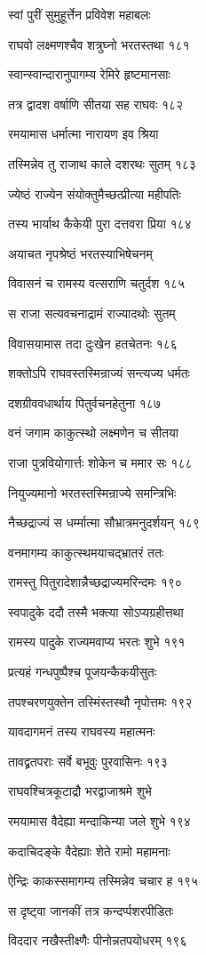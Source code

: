 स्वां पुरीं सुमुहूर्त्तेन प्रविवेश महाबलः

राघवो लक्ष्मणश्चैव शत्रुघ्नो भरतस्तथा १८१

स्वान्स्वान्दारानुपागम्य रेमिरे हृष्टमानसाः

तत्र द्वादश वर्षाणि सीतया सह राघवः १८२

रमयामास धर्मात्मा नारायण इव श्रिया

तस्मिन्नेव तु राजाथ काले दशरथः सुतम् १८३

ज्येष्ठं राज्येन संयोक्तुमैच्छत्प्रीत्या महीपतिः

तस्य भार्याथ कैकेयी पुरा दत्तवरा प्रिया १८४

अयाचत नृपश्रेष्ठं भरतस्याभिषेचनम्

विवासनं च रामस्य वत्सराणि चतुर्दश १८५

स राजा सत्यवचनाद्रामं राज्यादथोः सुतम्

विवासयामास तदा दुःखेन हतचेतनः १८६

शक्तोऽपि राघवस्तस्मिन्राज्यं सन्त्यज्य धर्मतः

दशग्रीववधार्थाय पितुर्वचनहेतुना १८७

वनं जगाम काकुत्स्थो लक्ष्मणेन च सीतया

राजा पुत्रवियोगार्त्तः शोकेन च ममार सः १८८

नियुज्यमानो भरतस्तस्मिन्राज्ये समन्त्रिभिः

नैच्छद्राज्यं स धर्म्मात्मा सौभ्रात्रमनुदर्शयन् १८९

वनमागम्य काकुत्स्थमयाचद्भ्रातरं ततः

रामस्तु पितुरादेशान्नैच्छद्राज्यमरिन्दमः १९०

स्वपादुके ददौ तस्मै भक्त्या सोऽप्यग्रहीत्तथा

रामस्य पादुके राज्यमवाप्य भरतः शुभे १९१

प्रत्यहं गन्धपुष्पैश्च पूजयन्कैकयीसुतः

तपश्चरणयुक्तेन तस्मिंस्तस्थौ नृपोत्तमः १९२

यावदागमनं तस्य राघवस्य महात्मनः

तावद्व्रतपराः सर्वे बभूवुः पुरवासिनः १९३

राघवश्चित्रकूटाद्रौ भरद्वाजाश्रमे शुभे

रमयामास वैदेह्या मन्दाकिन्या जले शुभे १९४

कदाचिदङ्के वैदेह्याः शेते रामो महामनाः

ऐन्द्रिः काकस्समागम्य तस्मिन्नेव चचार ह १९५

स दृष्ट्वा जानकीं तत्र कन्दर्प्पशरपीडितः

विददार नखैस्तीक्ष्णैः पीनोन्नतपयोधरम् १९६

